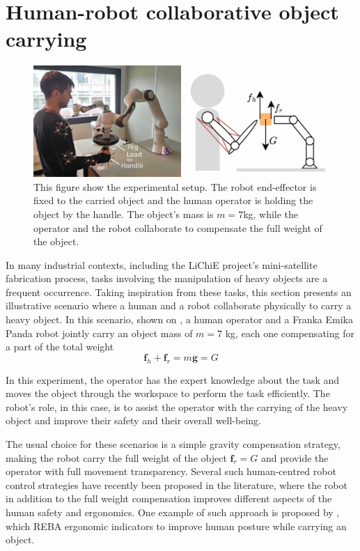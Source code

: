\section{Human-robot collaborative object carrying}
\label{ch:human_robot_carrying}

\begin{figure}[!h]
    \centering
    \includegraphics[width=0.9\linewidth]{Papers/images/exp2_real_schema.jpg}
    \caption{This figure show the experimental setup. The robot end-effector is fixed to the carried object and the human operator is holding the object by the handle. The object's mass is $m=7$kg, while the operator and the robot collaborate to compensate the full weight of the object.}
    \label{fig:exp2_real_schema}
\end{figure}

In many industrial contexts, including the LiChiE project's mini-satellite fabrication process, tasks involving the manipulation of heavy objects are a frequent occurrence. 
Taking inspiration from these tasks, this section presents an illustrative scenario where a human and a robot collaborate physically to carry a heavy object. In this scenario, shown on , a human operator and a {Franka Emika Panda} robot jointly carry an object mass of $m\!=\!7$ kg, each one compensating for a part of the total weight 
\begin{equation}
    \bm{f}_h  + \bm{f}_r = m\bm{g} = G
\end{equation}

In this experiment, the operator has the expert knowledge about the task and moves the object through the workspace to perform the task efficiently. The robot's role, in this case, is to assist the operator with the carrying of the heavy object and improve their safety and their overall well-being.

The usual choice for these scenarios is a simple gravity compensation strategy, making the robot carry the full weight of the object $\bm{f}_r = G$ and provide the operator with full movement transparency. Several such human-centred robot control strategies have recently been proposed in the literature, where the robot in addition to the full weight compensation improves different aspects of the human safety and ergonomics. One example of such approach is proposed by \citet{ferraguti2020unified}, which REBA \cite{reba} ergonomic indicators to improve human posture while carrying an object. 

